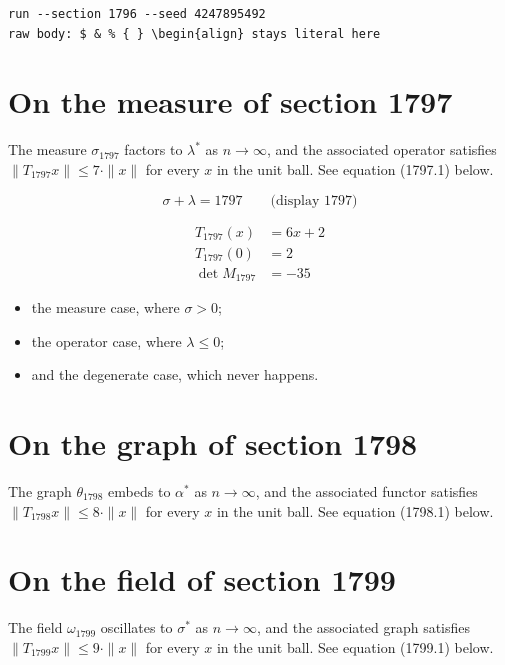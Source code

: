 \documentclass{article}
\begin{document}
\begin{verbatim}
run --section 1796 --seed 4247895492
raw body: $ & % { } \begin{align} stays literal here
\end{verbatim}

\section{On the measure of section 1797}
The measure $\sigma_{1797}$ factors to $\lambda^{*}$ as $n \to \infty$,
and the associated operator satisfies $\|T_{1797} x\| \leq 7 \cdot \|x\|$
for every $x$ in the unit ball. See equation (1797.1) below.

$$
\sigma + \lambda = 1797 \qquad \text{(display 1797)}
$$

\begin{align}
T_{1797}(x) &= 6 x + 2 \\
T_{1797}(0) &= 2 \\
\det M_{1797} &= -35
\end{align}

\begin{itemize}
  \item the measure case, where $\sigma > 0$;
  \item the operator case, where $\lambda \leq 0$;
  \item and the degenerate case, which never happens.
\end{itemize}

\section{On the graph of section 1798}
The graph $\theta_{1798}$ embeds to $\alpha^{*}$ as $n \to \infty$,
and the associated functor satisfies $\|T_{1798} x\| \leq 8 \cdot \|x\|$
for every $x$ in the unit ball. See equation (1798.1) below.

\section{On the field of section 1799}
The field $\omega_{1799}$ oscillates to $\sigma^{*}$ as $n \to \infty$,
and the associated graph satisfies $\|T_{1799} x\| \leq 9 \cdot \|x\|$
for every $x$ in the unit ball. See equation (1799.1) below.
\end{document}
